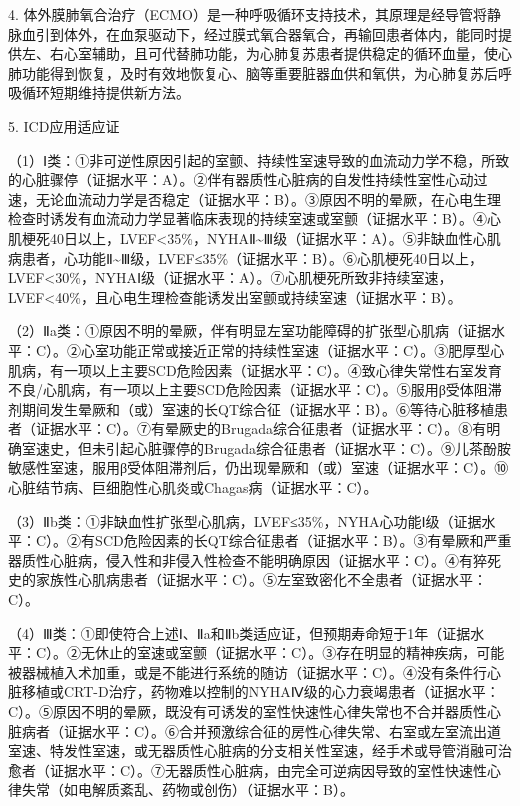 4.
体外膜肺氧合治疗（ECMO）是一种呼吸循环支持技术，其原理是经导管将静脉血引到体外，在血泵驱动下，经过膜式氧合器氧合，再输回患者体内，能同时提供左、右心室辅助，且可代替肺功能，为心肺复苏患者提供稳定的循环血量，使心肺功能得到恢复，及时有效地恢复心、脑等重要脏器血供和氧供，为心肺复苏后呼吸循环短期维持提供新方法。

5. ICD应用适应证

（1）Ⅰ类：①非可逆性原因引起的室颤、持续性室速导致的血流动力学不稳，所致的心脏骤停（证据水平：A）。②伴有器质性心脏病的自发性持续性室性心动过速，无论血流动力学是否稳定（证据水平：B）。③原因不明的晕厥，在心电生理检查时诱发有血流动力学显著临床表现的持续室速或室颤（证据水平：B）。④心肌梗死40日以上，LVEF\textless{}35\%，NYHAⅡ\textasciitilde{}Ⅲ级（证据水平：A）。⑤非缺血性心肌病患者，心功能Ⅱ\textasciitilde{}Ⅲ级，LVEF≤35\%（证据水平：B）。⑥心肌梗死40日以上，LVEF\textless{}30\%，NYHAⅠ级（证据水平：A）。⑦心肌梗死所致非持续室速，LVEF\textless{}40\%，且心电生理检查能诱发出室颤或持续室速（证据水平：B）。

（2）Ⅱa类：①原因不明的晕厥，伴有明显左室功能障碍的扩张型心肌病（证据水平：C）。②心室功能正常或接近正常的持续性室速（证据水平：C）。③肥厚型心肌病，有一项以上主要SCD危险因素（证据水平：C）。④致心律失常性右室发育不良/心肌病，有一项以上主要SCD危险因素（证据水平：C）。⑤服用β受体阻滞剂期间发生晕厥和（或）室速的长QT综合征（证据水平：B）。⑥等待心脏移植患者（证据水平：C）。⑦有晕厥史的Brugada综合征患者（证据水平：C）。⑧有明确室速史，但未引起心脏骤停的Brugada综合征患者（证据水平：C）。⑨儿茶酚胺敏感性室速，服用β受体阻滞剂后，仍出现晕厥和（或）室速（证据水平：C）。⑩心脏结节病、巨细胞性心肌炎或Chagas病（证据水平：C）。

（3）Ⅱb类：①非缺血性扩张型心肌病，LVEF≤35\%，NYHA心功能Ⅰ级（证据水平：C）。②有SCD危险因素的长QT综合征患者（证据水平：B）。③有晕厥和严重器质性心脏病，侵入性和非侵入性检查不能明确原因（证据水平：C）。④有猝死史的家族性心肌病患者（证据水平：C）。⑤左室致密化不全患者（证据水平：C）。

（4）Ⅲ类：①即使符合上述Ⅰ、Ⅱa和Ⅱb类适应证，但预期寿命短于1年（证据水平：C）。②无休止的室速或室颤（证据水平：C）。③存在明显的精神疾病，可能被器械植入术加重，或是不能进行系统的随访（证据水平：C）。④没有条件行心脏移植或CRT-D治疗，药物难以控制的NYHAⅣ级的心力衰竭患者（证据水平：C）。⑤原因不明的晕厥，既没有可诱发的室性快速性心律失常也不合并器质性心脏病者（证据水平：C）。⑥合并预激综合征的房性心律失常、右室或左室流出道室速、特发性室速，或无器质性心脏病的分支相关性室速，经手术或导管消融可治愈者（证据水平：C）。⑦无器质性心脏病，由完全可逆病因导致的室性快速性心律失常（如电解质紊乱、药物或创伤）（证据水平：B）。



